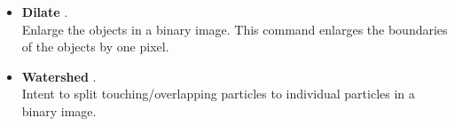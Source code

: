 \begin{itemize}
\item \textbf{Dilate} .\\
Enlarge the objects in a binary image. This command enlarges the boundaries of the objects by one pixel.

\item \textbf{Watershed} .\\
Intent to split touching/overlapping particles to individual particles in a binary image.

\end{itemize}
 
 
\newpage